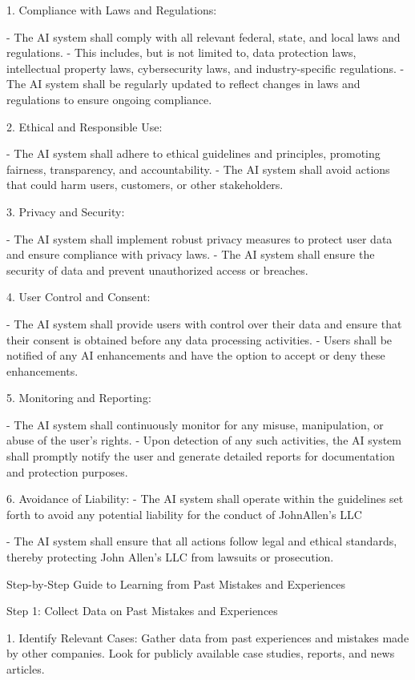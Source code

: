 \documentclass[12pt,letterpaper]{article}
\begin{document}
1. Compliance with Laws and Regulations:

   - The AI system shall comply with all relevant federal, state, and local laws and regulations.
   - This includes, but is not limited to, data protection laws, intellectual property laws, cybersecurity laws, and industry-specific regulations.
   - The AI system shall be regularly updated to reflect changes in laws and regulations to ensure ongoing compliance.

2. Ethical and Responsible Use:

   - The AI system shall adhere to ethical guidelines and principles, promoting fairness, transparency, and accountability.
   - The AI system shall avoid actions that could harm users, customers, or other stakeholders.

3. Privacy and Security:

   - The AI system shall implement robust privacy measures to protect user data and ensure compliance with privacy laws.
   - The AI system shall ensure the security of data and prevent unauthorized access or breaches.

4. User Control and Consent:

   - The AI system shall provide users with control over their data and ensure that their consent is obtained before any data processing activities.
   - Users shall be notified of any AI enhancements and have the option to accept or deny these enhancements.

5. Monitoring and Reporting:

   - The AI system shall continuously monitor for any misuse, manipulation, or abuse of the user's rights.
   - Upon detection of any such activities, the AI system shall promptly notify the user and generate detailed reports for documentation and protection purposes.

6. Avoidance of Liability:
   - The AI system shall operate within the guidelines set forth to avoid any potential liability for the conduct of JohnAllen’s LLC

   - The AI system shall ensure that all actions follow legal and ethical standards, thereby protecting John Allen’s LLC from lawsuits or prosecution.



Step-by-Step Guide to Learning from Past Mistakes and Experiences

 Step 1: Collect Data on Past Mistakes and Experiences

1. Identify Relevant Cases: Gather data from past experiences and mistakes made by other companies. Look for publicly available case studies, reports, and news articles.
\end{document}
